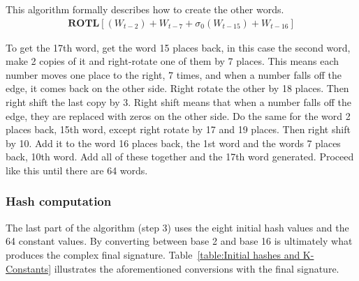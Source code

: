         
        This algorithm formally describes how to create the other words. 
        \begin{gather}
             \textbf{ROTL} [(W_{t-2}) + W_{t-7} + \sigma_0(W_{t-15}) + W_{t-16}]
        \end{gather}
        
        
        To get the 17th word, get the word 15 places back, in this case the second word, make 2 copies of it and right-rotate one of them by 7 places. This means each number moves one place to the right, 7 times, and when a number falls off the edge, it comes back on the other side. Right rotate the other by 18 places. Then right shift the last copy by 3. Right shift means that when a number falls off the edge, they are replaced with zeros on the other side. Do the same for the word 2 places back, 15th word, except right rotate by 17 and 19 places. Then right shift by 10. Add it to the word 16 places back, the 1st word and the words 7 places back, 10th word. Add all of these together and the 17th word generated. Proceed like this until there are 64 words. 
        
        \subsubsection{ Hash computation}
        
        The last part of the algorithm (step 3) uses the eight initial hash values and the 64 constant values. By converting between base 2 and base 16 is ultimately what produces the complex final signature. Table~\ref{table:Initial hashes and K-Constants} illustrates the aforementioned conversions with the final signature.
        
        
            
